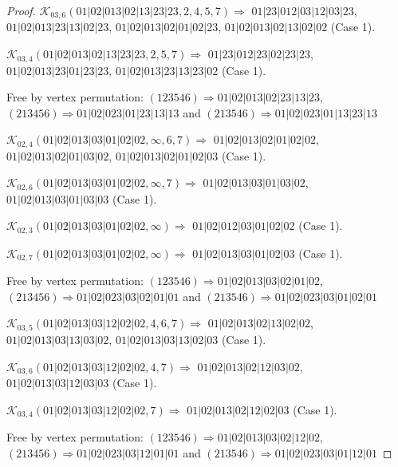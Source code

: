 \documentclass[12pt]{article}
\theoremstyle{plain}
\theoremstyle{definition}
\theoremstyle{remark}
\newcommand{\fancy}[1]{\mathcal{#1}}
\def\K{\fancy{K}}
\begin{document}
\begin{proof}
	
	
	\bigskip
	
	$\K_{03,6}(01|02|013|02|13|23|23,2, 4, 5, 7)\Rightarrow $ $01|23|012|03|12|03|23$, $01|02|013|23|13|02|23$, $01|02|013|02|01|02|23$, $01|02|013|02|13|02|02$ (Case 1).
	
	$\K_{03,4}(01|02|013|02|13|23|23,2, 5, 7)\Rightarrow $ $01|23|012|23|02|23|23$, $01|02|013|23|01|23|23$, $01|02|013|23|13|23|02$ (Case 1).
	
	
	
	Free by vertex permutation: $(1 2 3 5 4 6)\Rightarrow 01|02|013|02|23|13|23$, $(2 1 3 4 5 6)\Rightarrow 01|02|023|01|23|13|13$ and $(2 1 3 5 4 6)\Rightarrow 01|02|023|01|13|23|13$
	
	
	
	\bigskip
	
	$\K_{02,4}(01|02|013|03|01|02|02,\infty,6, 7)\Rightarrow $ $01|02|013|02|01|02|02$, $01|02|013|02|01|03|02$, $01|02|013|02|01|02|03$ (Case 1).
	
	$\K_{02,6}(01|02|013|03|01|02|02,\infty,7)\Rightarrow $ $01|02|013|03|01|03|02$, $01|02|013|03|01|03|03$ (Case 1).
	
	$\K_{02,3}(01|02|013|03|01|02|02,\infty)\Rightarrow $ $01|02|012|03|01|02|02$ (Case 1).
	
	$\K_{02,7}(01|02|013|03|01|02|02,\infty)\Rightarrow $ $01|02|013|03|01|02|03$ (Case 1).
	
	
	
	Free by vertex permutation: $(1 2 3 5 4 6)\Rightarrow 01|02|013|03|02|01|02$, $(2 1 3 4 5 6)\Rightarrow 01|02|023|03|02|01|01$ and $(2 1 3 5 4 6)\Rightarrow 01|02|023|03|01|02|01$
	
	
	
	\bigskip
	
	$\K_{03,5}(01|02|013|03|12|02|02,4, 6, 7)\Rightarrow $ $01|02|013|02|13|02|02$, $01|02|013|03|13|03|02$, $01|02|013|03|13|02|03$ (Case 1).
	
	$\K_{03,6}(01|02|013|03|12|02|02,4, 7)\Rightarrow $ $01|02|013|02|12|03|02$, $01|02|013|03|12|03|03$ (Case 1).
	
	$\K_{03,4}(01|02|013|03|12|02|02,7)\Rightarrow $ $01|02|013|02|12|02|03$ (Case 1).
	
	
	
	Free by vertex permutation: $(1 2 3 5 4 6)\Rightarrow 01|02|013|03|02|12|02$, $(2 1 3 4 5 6)\Rightarrow 01|02|023|03|12|01|01$ and $(2 1 3 5 4 6)\Rightarrow 01|02|023|03|01|12|01$
	
	
	
	\bigskip
	

\end{proof}
\end{document}
